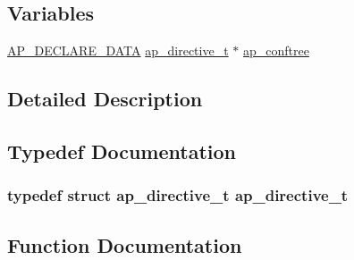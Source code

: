 \subsection*{Variables}
\begin{DoxyCompactItemize}
\item 
\hyperlink{ap__config_8h_a0bb4c3adf74510a0dcdad5b125725fe0}{A\+P\+\_\+\+D\+E\+C\+L\+A\+R\+E\+\_\+\+D\+A\+TA} \hyperlink{structap__directive__t}{ap\+\_\+directive\+\_\+t} $\ast$ \hyperlink{group__APACHE__CORE__CONFIG__TREE_gaf55369733bb7702836b806e63ff41503}{ap\+\_\+conftree}
\end{DoxyCompactItemize}


\subsection{Detailed Description}


\subsection{Typedef Documentation}
\subsubsection[{\texorpdfstring{ap\+\_\+directive\+\_\+t}{ap_directive_t}}]{\setlength{\rightskip}{0pt plus 5cm}typedef struct {\bf ap\+\_\+directive\+\_\+t} {\bf ap\+\_\+directive\+\_\+t}}\hypertarget{group__APACHE__CORE__CONFIG__TREE_ga7c3b646fd4dc997589ecfa1aaacac838}{}\label{group__APACHE__CORE__CONFIG__TREE_ga7c3b646fd4dc997589ecfa1aaacac838}


\subsection{Function Documentation}
